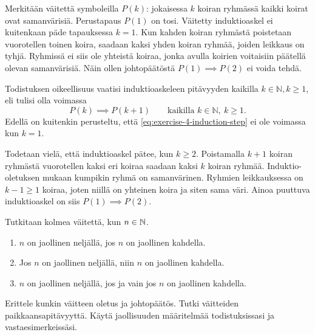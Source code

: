 \documentclass[12pt,a4paper]{article}
\begin{document}
\begin{solution}
  Merkitään väitettä symboleilla \(P(k)\): jokaisessa \(k\) koiran ryhmässä
  kaikki koirat ovat samanvärisiä. Perustapaus \(P(1)\) on tosi. Väitetty
  induktioaskel ei kuitenkaan päde tapauksessa \(k = 1\). Kun kahden koiran
  ryhmästä poistetaan vuorotellen toinen koira, saadaan kaksi yhden koiran
  ryhmää, joiden leikkaus on tyhjä. Ryhmissä ei siis ole yhteistä koiraa,
  jonka avulla koirien voitaisiin päätellä olevan samanvärisiä. Näin ollen
  johtopäätöstä \(P(1) \implies P(2)\) ei voida tehdä.

  Todistuksen oikeellisuus vaatisi induktioaskeleen pitävyyden kaikilla
  \(k \in \mathbb{N}, k \geq 1\), eli tulisi olla voimassa
  \begin{equation}\label{eq:exercise-4-induction-step}
    P(k) \implies P(k + 1)
    \qquad \text{kaikilla } k \in \mathbb{N},\ k \geq 1.
  \end{equation}
  Edellä on kuitenkin perusteltu, että \eqref{eq:exercise-4-induction-step} ei
  ole voimassa kun \(k = 1\).

  Todetaan vielä, että induktioaskel pätee, kun \(k \geq 2\).
  Poistamalla \(k + 1\) koiran ryhmästä vuorotellen kaksi eri koiraa saadaan
  kaksi \(k\) koiran ryhmää. Induktio-oletuksen mukaan kumpikin ryhmä on
  samanvärinen. Ryhmien leikkauksessa on \(k - 1 \geq 1\) koiraa, joten niillä
  on yhteinen koira ja siten sama väri. Ainoa puuttuva induktioaskel on siis
  \(P(1) \implies P(2)\).
\end{solution}

\begin{exercise}
  Tutkitaan kolmea väitettä, kun \(n \in \mathbb{N}\).
  \begin{enumerate}[label=(\arabic*), nosep]
    \item \(n\) on jaollinen neljällä, jos \(n\) on jaollinen kahdella.
    \item Jos \(n\) on jaollinen neljällä, niin \(n\) on jaollinen kahdella.
    \item \(n\) on jaollinen neljällä, jos ja vain jos \(n\) on
      jaollinen kahdella.
  \end{enumerate}
  Erittele kunkin väitteen oletus ja johtopäätös. Tutki väitteiden
  paikkaansapitävyyttä.
  Käytä jaollisuuden määritelmää todistuksissasi ja vastaesimerkeissäsi.
\end{exercise}
\end{document}
